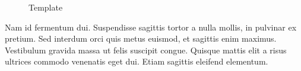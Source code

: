 \documentclass[sigconf]{acmart}
\begin{document}
\begin{figure}[h]
	\centering
	\caption{Template}
\end{figure}

Nam id fermentum dui. Suspendisse sagittis tortor a nulla mollis, in
pulvinar ex pretium. Sed interdum orci quis metus euismod, et sagittis
enim maximus. Vestibulum gravida massa ut felis suscipit
congue. Quisque mattis elit a risus ultrices commodo venenatis eget
dui. Etiam sagittis eleifend elementum.
\end{document}
